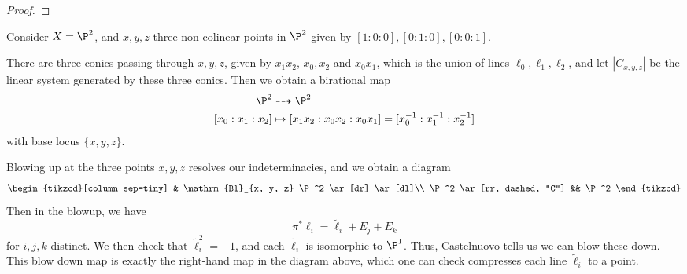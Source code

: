 \documentclass[a4paper]{article}
\newcommand\Bl{\mathrm{Bl}}
\begin{document}
\begin{proof}
\end{proof}

\begin{eg}
  Consider $X = \P^2$, and $x, y, z$ three non-colinear points in $\P^2$ given by $[1:0:0], [0:1:0], [0:0:1]$.

  There are three conics passing through $x, y, z$, given by $x_1 x_2$, $x_0, x_2$ and $x_0 x_1$, which is the union of lines $\ell_0, \ell_1, \ell_2$, and let $|C_{x, y, z}|$ be the linear system generated by these three conics. Then we obtain a birational map
  \begin{align*}
    \P^2 &\dashrightarrow \P^2\\
    [x_0:x_1:x_2] & \mapsto [x_1 x_2: x_0 x_2: x_0 x_1] = [x_0^{-1}:x_1^{-1}:x_2^{-1}]
  \end{align*}
  with base locus $\{x, y, z\}$.

  Blowing up at the three points $x, y, z$ resolves our indeterminacies, and we obtain a diagram
  \[
    \begin{tikzcd}[column sep=tiny]
      & \Bl_{x, y, z} \P^2 \ar[dr] \ar[dl]\\
      \P^2 \ar[rr, dashed, "C"] && \P^2
    \end{tikzcd}
  \]
  Then in the blowup, we have
  \[
    \pi^* \ell_i = \tilde{\ell}_i + E_j + E_k
  \]
  for $i, j, k$ distinct. We then check that $\tilde{\ell}_i^2 = -1$, and each $\tilde{\ell}_i$ is isomorphic to $\P^1$.  Thus, Castelnuovo tells us we can blow these down. This blow down map is exactly the right-hand map in the diagram above, which one can check compresses each line $\tilde{\ell}_i$ to a point.
\end{eg}
\end{document}
